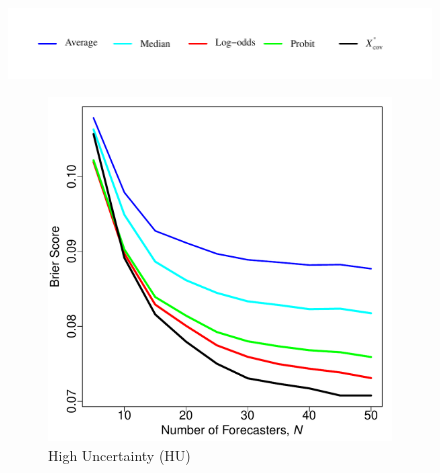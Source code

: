 \documentclass[11pt]{article}
\theoremstyle{definition}
\theoremstyle{definition}
\begin{document}
\begin{figure}[t!]
\vspace{-2em}
\centering
\hspace*{1em} 	\includegraphics[width=\textwidth]{legendReal.pdf} %
\vspace{-4em}

        \centering
        \begin{subfigure}{0.32\textwidth}
                \includegraphics[width=\textwidth]{realHU}
                \caption{High Uncertainty (HU)}
                                \label{highUnc}
        \end{subfigure}
        \begin{subfigure}{0.32\textwidth}

\end{subfigure}
\end{figure}
\end{document}
